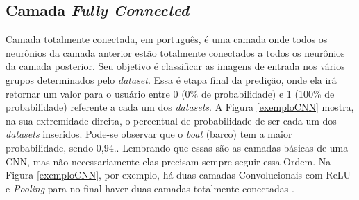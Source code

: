 \subsection{Camada \textit{Fully Connected}}

Camada totalmente conectada, em português, é uma camada onde todos os neurônios da camada anterior estão totalmente conectados a todos os neurônios da camada posterior. Seu objetivo é classificar as imagens de entrada nos vários grupos determinados pelo \textit{dataset}. Essa é etapa final da predição, onde ela irá retornar um valor para o usuário entre 0 (0\% de probabilidade) e 1 (100\% de probabilidade) referente a cada um dos \textit{datasets}. A Figura \ref{exemploCNN} mostra, na sua extremidade direita, o percentual de probabilidade de ser cada um dos \textit{datasets} inseridos. Pode-se observar que o \textit{boat} (barco) tem a maior probabilidade, sendo 0,94.\cite{conv2, aprendizadoDeMaquinaDivertido}. 
Lembrando que essas são as camadas básicas de uma CNN, mas não necessariamente elas precisam sempre seguir essa Ordem. Na Figura \ref{exemploCNN}, por exemplo, há duas camadas Convolucionais com ReLU e \textit{Pooling} para no final haver duas camadas totalmente conectadas \cite{conv2}.

\begin{figure}[H]
	\centering
\end{figure}
